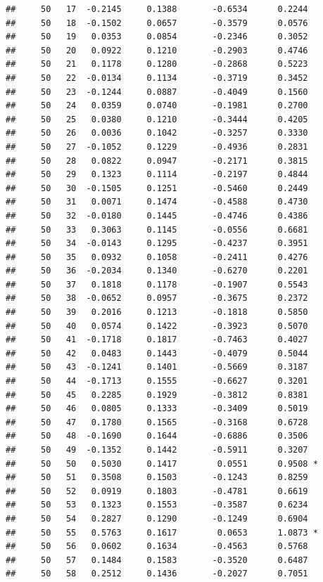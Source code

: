 \documentclass[
]{article}
\begin{document}
\begin{verbatim}
##     50   17  -0.2145     0.1388       -0.6534      0.2244  
##     50   18  -0.1502     0.0657       -0.3579      0.0576  
##     50   19   0.0353     0.0854       -0.2346      0.3052  
##     50   20   0.0922     0.1210       -0.2903      0.4746  
##     50   21   0.1178     0.1280       -0.2868      0.5223  
##     50   22  -0.0134     0.1134       -0.3719      0.3452  
##     50   23  -0.1244     0.0887       -0.4049      0.1560  
##     50   24   0.0359     0.0740       -0.1981      0.2700  
##     50   25   0.0380     0.1210       -0.3444      0.4205  
##     50   26   0.0036     0.1042       -0.3257      0.3330  
##     50   27  -0.1052     0.1229       -0.4936      0.2831  
##     50   28   0.0822     0.0947       -0.2171      0.3815  
##     50   29   0.1323     0.1114       -0.2197      0.4844  
##     50   30  -0.1505     0.1251       -0.5460      0.2449  
##     50   31   0.0071     0.1474       -0.4588      0.4730  
##     50   32  -0.0180     0.1445       -0.4746      0.4386  
##     50   33   0.3063     0.1145       -0.0556      0.6681  
##     50   34  -0.0143     0.1295       -0.4237      0.3951  
##     50   35   0.0932     0.1058       -0.2411      0.4276  
##     50   36  -0.2034     0.1340       -0.6270      0.2201  
##     50   37   0.1818     0.1178       -0.1907      0.5543  
##     50   38  -0.0652     0.0957       -0.3675      0.2372  
##     50   39   0.2016     0.1213       -0.1818      0.5850  
##     50   40   0.0574     0.1422       -0.3923      0.5070  
##     50   41  -0.1718     0.1817       -0.7463      0.4027  
##     50   42   0.0483     0.1443       -0.4079      0.5044  
##     50   43  -0.1241     0.1401       -0.5669      0.3187  
##     50   44  -0.1713     0.1555       -0.6627      0.3201  
##     50   45   0.2285     0.1929       -0.3812      0.8381  
##     50   46   0.0805     0.1333       -0.3409      0.5019  
##     50   47   0.1780     0.1565       -0.3168      0.6728  
##     50   48  -0.1690     0.1644       -0.6886      0.3506  
##     50   49  -0.1352     0.1442       -0.5911      0.3207  
##     50   50   0.5030     0.1417        0.0551      0.9508 *
##     50   51   0.3508     0.1503       -0.1243      0.8259  
##     50   52   0.0919     0.1803       -0.4781      0.6619  
##     50   53   0.1323     0.1553       -0.3587      0.6234  
##     50   54   0.2827     0.1290       -0.1249      0.6904  
##     50   55   0.5763     0.1617        0.0653      1.0873 *
##     50   56   0.0602     0.1634       -0.4563      0.5768  
##     50   57   0.1484     0.1583       -0.3520      0.6487  
##     50   58   0.2512     0.1436       -0.2027      0.7051  

\end{verbatim}
\end{document}
